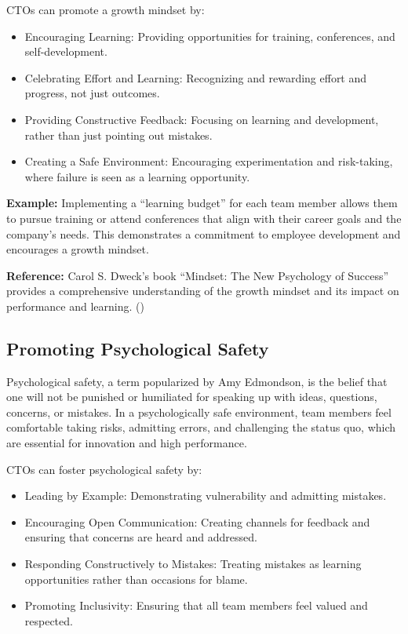 CTOs can promote a growth mindset by:
\begin{itemize}
    \item Encouraging Learning: Providing opportunities for training, conferences, and self-development.
    \item Celebrating Effort and Learning: Recognizing and rewarding effort and progress, not just outcomes.
    \item Providing Constructive Feedback: Focusing on learning and development, rather than just pointing out mistakes.
    \item Creating a Safe Environment: Encouraging experimentation and risk-taking, where failure is seen as a learning opportunity.
\end{itemize}

\textbf{Example:} Implementing a ``learning budget'' for each team member allows them to pursue training or attend conferences that align with their career goals and the company's needs. This demonstrates a commitment to employee development and encourages a growth mindset.

\textbf{Reference:} Carol S. Dweck's book ``Mindset: The New Psychology of Success'' provides a comprehensive understanding of the growth mindset and its impact on performance and learning. (\cite{dweck2015})

\subsection{Promoting Psychological Safety}

Psychological safety, a term popularized by Amy Edmondson, is the belief that one will not be punished or humiliated for speaking up with ideas, questions, concerns, or mistakes. In a psychologically safe environment, team members feel comfortable taking risks, admitting errors, and challenging the status quo, which are essential for innovation and high performance.

CTOs can foster psychological safety by:
\begin{itemize}
    \item Leading by Example: Demonstrating vulnerability and admitting mistakes.
    \item Encouraging Open Communication: Creating channels for feedback and ensuring that concerns are heard and addressed.
    \item Responding Constructively to Mistakes: Treating mistakes as learning opportunities rather than occasions for blame.
    \item Promoting Inclusivity: Ensuring that all team members feel valued and respected.
\end{itemize}

